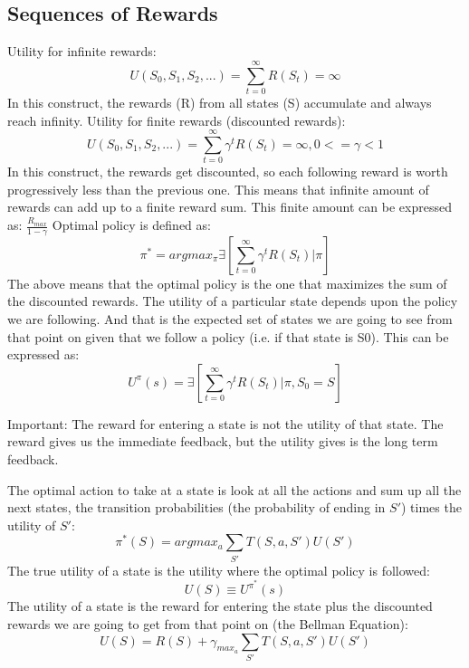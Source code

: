 \documentclass{article}
\begin{document}
\subsection{Sequences of Rewards}
Utility for infinite rewards:
\begin{equation*}
  U(S_0, S_1, S_2, ...) = \sum_{t=0}^{\infty} R(S_t) = \infty
\end{equation*}
In this construct, the rewards (R) from all states (S) accumulate and always reach infinity.
Utility for finite rewards (discounted rewards):
\begin{equation*}
  U(S_0, S_1, S_2, ...) = \sum_{t=0}^{\infty} \gamma^t R(S_t) = \infty, 0 <= \gamma < 1
\end{equation*}
In this construct, the rewards get discounted, so each following reward is worth progressively less than the previous one. This means that infinite amount of rewards can add up to a finite reward sum. This finite amount can be expressed as: $\frac{R_{max}}{1-\gamma}$
Optimal policy is defined as:
\begin{equation*}
  \pi^* = argmax_{\pi} \exists \left[ \sum_{t=0}^{\infty} \gamma^t R(S_t) | \pi \right]
\end{equation*}
The above means that the optimal policy is the one that maximizes the sum of the discounted rewards.
The utility of a particular state depends upon the policy we are following. And that is the expected set of states we are going to see from that point on given that we follow a policy (i.e. if that state is S0). This can be expressed as:
\begin{equation*}
  U^{\pi}(s) = \exists \left[ \sum_{t=0}^{\infty} \gamma^t R(S_t) | \pi, S_0 = S \right]
\end{equation*}
\begin{framed}
Important: The reward for entering a state is not the utility of that state. The reward gives us the immediate feedback, but the utility gives is the long term feedback.
\end{framed}
The optimal action to take at a state is look at all the actions and sum up all the next states, the transition probabilities (the probability of ending in $S'$) times the utility of $S'$:
\begin{equation*}
  \pi^*(S) = argmax_a \sum_{S'} T(S, a, S') U(S')
\end{equation*}
The true utility of a state is the utility where the optimal policy is followed:
\begin{equation*}
  U(S) \equiv U^{\pi^*}(s)
\end{equation*}
The utility of a state is the reward for entering the state plus the discounted rewards we are going to get from that point on (the Bellman Equation):
\begin{equation}
  U(S) = R(S) + \gamma_{max_a} \sum_{S'} T(S, a, S') U(S')
\end{equation}
\end{document}
